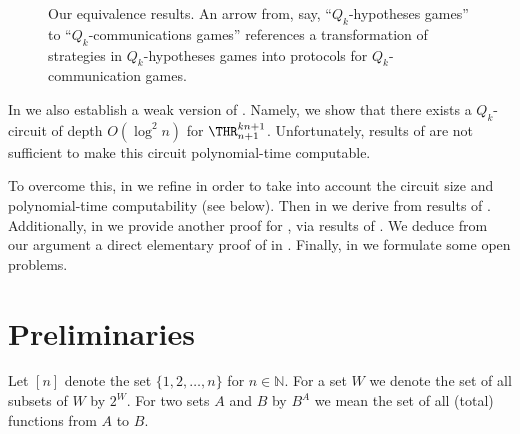 \begin{figure}[h!]
{
}
\caption{Our equivalence results. An arrow from, say, ``$Q_k$-hypotheses games'' to ``$Q_k$-communications games'' references a transformation of strategies in $Q_k$-hypotheses games into protocols for $Q_k$-communication games.}
\end{figure}

In  we also establish a weak version of . Namely, we show that there exists 
%
a $Q_k$-circuit of depth $O(\log^2n)$  %
for $\THR^{kn+1}_{n+1}$. Unfortunately, results of  are not sufficient to make this circuit polynomial-time computable.

To overcome this, in  we refine   in order to take into account the circuit size and polynomial-time computability (see   below). Then in  we derive  from results of . Additionally, in  we provide another proof for , via results of .
We deduce from our argument a direct elementary proof of  in . Finally, in  we formulate some open problems.















\section{Preliminaries} \label{sec:prelim}
Let $[n]$ denote the set $\{1, 2, \ldots, n\}$ for $n\in\mathbb{N}$. For a set $W$ we denote the set of all subsets of $W$ by $2^W$. For two sets $A$ and $B$ by $B^A$ we mean the set of all (total) functions from $A$ to $B$.

